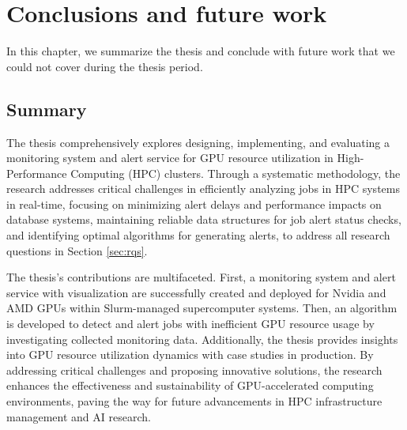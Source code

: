 \chapter{Conclusions and future work}
\label{chap:conclusions}
In this chapter, we summarize the thesis and conclude with future work that we could not cover during the thesis period.

\section{Summary}

The thesis comprehensively explores designing, implementing, and evaluating a monitoring system and alert service for GPU resource utilization in High-Performance Computing (HPC) clusters. Through a systematic methodology, the research addresses critical challenges in efficiently analyzing jobs in HPC systems in real-time, focusing on minimizing alert delays and performance impacts on database systems, maintaining reliable data structures for job alert status checks, and identifying optimal algorithms for generating alerts, to address all research questions in Section \ref{sec:rqs}.

The thesis's contributions are multifaceted. First, a monitoring system and alert service with visualization are successfully created and deployed for Nvidia and AMD GPUs within Slurm-managed supercomputer systems. Then, an algorithm is developed to detect and alert jobs with inefficient GPU resource usage by investigating collected monitoring data. Additionally, the thesis provides insights into GPU resource utilization dynamics with case studies in production. By addressing critical challenges and proposing innovative solutions, the research enhances the effectiveness and sustainability of GPU-accelerated computing environments, paving the way for future advancements in HPC infrastructure management and AI research.



